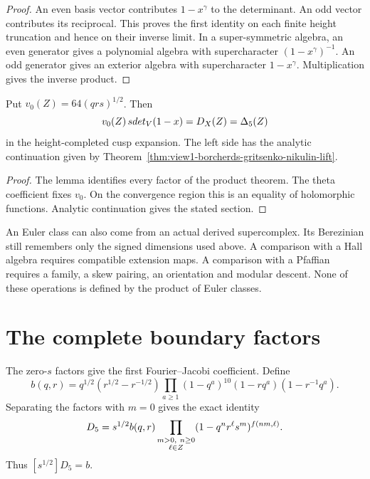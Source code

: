 \begin{proof}
An even basis vector contributes \(1-x^\gamma\) to the determinant.
An odd vector contributes its reciprocal.  This proves the first
identity on each finite height truncation and hence on their inverse
limit.  In a super-symmetric algebra, an even generator gives a
polynomial algebra with supercharacter \((1-x^\gamma)^{-1}\).
An odd generator gives an exterior algebra with supercharacter
\(1-x^\gamma\).  Multiplication gives the inverse product.
\end{proof}

\begin{proposition}
\label{prop:bgn-identification-recap}
Put \(v_0(Z)=64(qrs)^{1/2}\).
Then
\[
 v_0(Z)\,sdet_V(1-x)=D_X(Z)=\Delta_5(Z)
\]
in the height-completed cusp expansion.  The left side has the
analytic continuation given by
Theorem~\ref{thm:view1-borcherds-gritsenko-nikulin-lift}.
\end{proposition}

\begin{proof}
The lemma identifies every factor of the product theorem.
The theta coefficient fixes \(v_0\).
On the convergence region this is an equality of holomorphic
functions.  Analytic continuation gives the stated section.
\end{proof}

\begin{remark}
\label{rem:view1-bgn-scope}
An Euler class can also come from an actual derived supercomplex.
Its Berezinian still remembers only the signed dimensions used above.
A comparison with a Hall algebra requires compatible extension maps.
A comparison with a Pfaffian requires a family, a skew pairing,
an orientation and modular descent.  None of these operations is
defined by the product of Euler classes.
\end{remark}

\section{The complete boundary factors}
\label{sec:view1-boundary-factors}

The zero-\(s\) factors give the first Fourier--Jacobi coefficient.
Define
\[
 b(q,r)=q^{1/2}(r^{1/2}-r^{-1/2})
 \prod_{a\geq1}(1-q^a)^{10}(1-rq^a)(1-r^{-1}q^a).
\]
Separating the factors with \(m=0\) gives the exact identity
\[
 D_5=s^{1/2}b(q,r)
 \prod_{\substack{m>0,\ n\geq0\\\ell\in Z}}
                    (1-q^nr^\ell s^m)^{f(nm,\ell)}.
\]
Thus \([s^{1/2}]D_5=b\).

